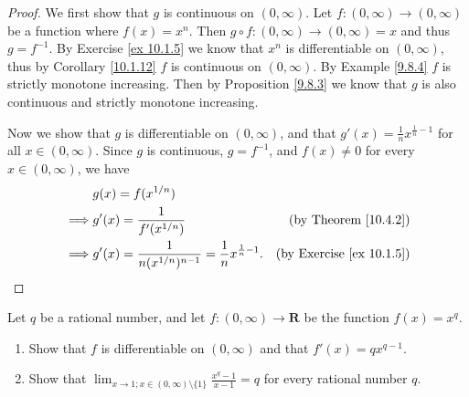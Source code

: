 \begin{proof}
    We first show that \(g\) is continuous on \((0, \infty)\).
    Let \(f : (0, \infty) \to (0, \infty)\) be a function where \(f(x) = x^n\).
    Then \(g \circ f : (0, \infty) \to (0, \infty) = x\) and thus \(g = f^{-1}\).
    By Exercise \ref{ex 10.1.5} we know that \(x^n\) is differentiable on \((0, \infty)\), thus by Corollary \ref{10.1.12} \(f\) is continuous on \((0, \infty)\).
    By Example \ref{9.8.4} \(f\) is strictly monotone increasing.
    Then by Proposition \ref{9.8.3} we know that \(g\) is also continuous and strictly monotone increasing.

    Now we show that \(g\) is differentiable on \((0, \infty)\), and that \(g'(x) = \frac{1}{n} x^{\frac{1}{n} - 1}\) for all \(x \in (0, \infty)\).
    Since \(g\) is continuous, \(g = f^{-1}\), and \(f(x) \neq 0\) for every \(x \in (0, \infty)\), we have
    \begin{align*}
                 & g(x) = f(x^{1 / n})                                                                                               \\
        \implies & g'(x) = \frac{1}{f'(x^{1 / n})}                                            & \text{(by Theorem \ref{10.4.2})}     \\
        \implies & g'(x) = \frac{1}{n (x^{1 / n})^{n - 1}} = \frac{1}{n} x^{\frac{1}{n} - 1}. & \text{(by Exercise \ref{ex 10.1.5})}
    \end{align*}
\end{proof}

\begin{exercise}\label{ex 10.4.2}
    Let \(q\) be a rational number, and let \(f : (0, \infty) \to \mathbf{R}\) be the function \(f(x) = x^q\).
    \begin{enumerate}
        \item Show that \(f\) is differentiable on \((0, \infty)\) and that \(f'(x) = q x^{q - 1}\).
        \item Show that \(\lim_{x \to 1 ; x \in (0, \infty) \setminus \{1\}} \frac{x^q - 1}{x - 1} = q\) for every rational number \(q\).
    \end{enumerate}
\end{exercise}

